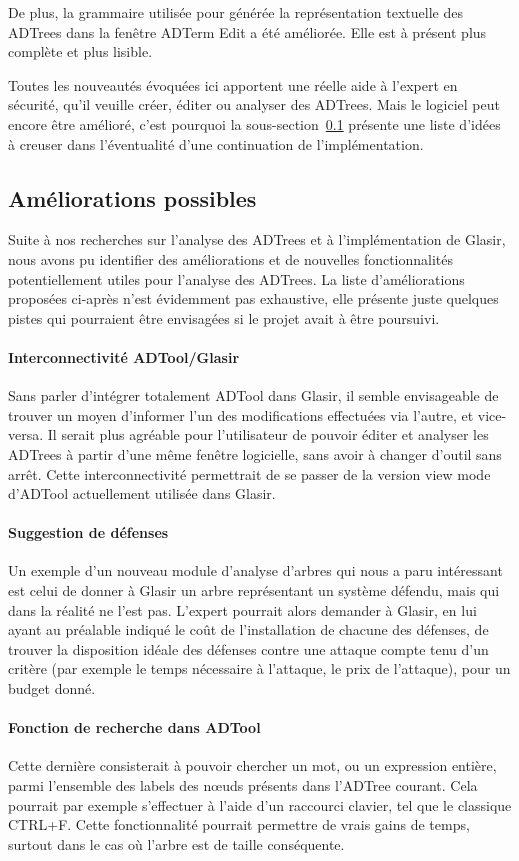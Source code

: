 De plus, la grammaire utilisée pour générée la représentation textuelle des ADTrees dans la fenêtre \og ADTerm Edit \fg{} a été améliorée. Elle est à présent plus complète et plus lisible.

Toutes les nouveautés évoquées ici apportent une réelle aide à l'expert en sécurité, qu'il veuille créer, éditer ou analyser des ADTrees. Mais le logiciel peut encore être amélioré, c'est pourquoi la {\sc sous-section}~\ref{subsec:encorePlusMieux} présente une liste d'idées à creuser dans l'éventualité d'une continuation de l'implémentation.

\subsection{Améliorations possibles}
\label{subsec:encorePlusMieux}

Suite à nos recherches sur l'analyse des ADTrees et à l'implémentation de Glasir, nous avons pu identifier des améliorations et de nouvelles fonctionnalités potentiellement utiles pour l'analyse des ADTrees. La liste d'améliorations proposées ci-après n'est évidemment pas exhaustive, elle présente juste quelques pistes qui pourraient être envisagées si le projet avait à être poursuivi.

\paragraph{Interconnectivité ADTool/Glasir} Sans parler d'intégrer totalement ADTool dans Glasir, il semble envisageable de trouver un moyen d'informer l'un des modifications effectuées via l'autre, et vice-versa. Il serait plus agréable pour l'utilisateur de pouvoir éditer et analyser les ADTrees à partir d'une même fenêtre logicielle, sans avoir à changer d'outil sans arrêt. Cette interconnectivité permettrait de se passer de la version \og view mode \fg{} d'ADTool actuellement utilisée dans Glasir. 

\paragraph{Suggestion de défenses} Un exemple d'un nouveau module d'analyse d'arbres qui nous a paru intéressant est celui de donner à Glasir un arbre représentant un système défendu, mais qui dans la réalité ne l'est pas. L'expert pourrait alors demander à Glasir, en lui ayant au préalable indiqué le coût de l'installation de chacune des défenses, de trouver la disposition idéale des défenses contre une attaque compte tenu d'un critère (par exemple le temps nécessaire à l'attaque, le prix de l'attaque), pour un budget donné.

\paragraph{Fonction de recherche dans ADTool} Cette dernière consisterait à pouvoir chercher un mot, ou un expression entière, parmi l'ensemble des labels des n\oe{}uds présents dans l'ADTree courant. Cela pourrait par exemple s'effectuer à l'aide d'un raccourci clavier, tel que le classique {\sc CTRL+F}. Cette fonctionnalité pourrait permettre de vrais gains de temps, surtout dans le cas où l'arbre est de taille conséquente.
